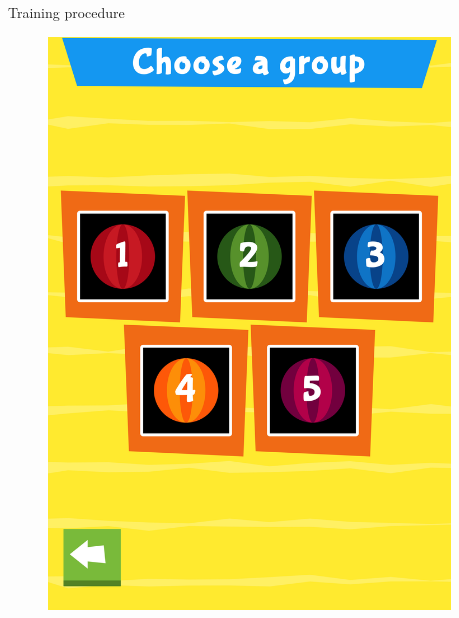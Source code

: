 \documentclass[final,xcolor={cmyk,hyperref}]{beamer}
\begin{document}
\begin{frame}[t]
\begin{columns}[t]
\begin{column}{0.45\linewidth}
\begin{block}{Training procedure}
\begin{figure}[h]
\begin{columns}
\begin{column}{\screenshotwidth}
    \includegraphics[width=\linewidth]{images/CALVin-screenshots/jpgs/choose_group}
  \end{column}
  \begin{column}{\screenshotwidth}

\end{column}
\end{columns}
\end{figure}
\end{block}
\end{column}
\end{columns}
\end{frame}
\end{document}
